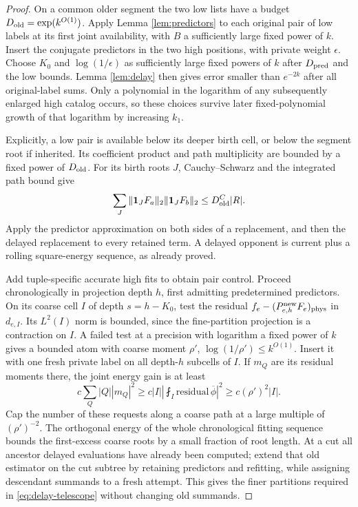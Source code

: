 \documentclass[11pt]{article}
\theoremstyle{definition}
\newcommand{\one}{\mathbf 1}
\newcommand{\avint}{\fint}
\newcommand{\phys}{\mathrm{phys}}
\numberwithin{equation}{section}
\begin{document}
\begin{proof}
On a common older segment the two low lists have a budget $D_{\rm old}=\exp(k^{O(1)})$. Apply Lemma \ref{lem:predictors} to each original pair of low labels at its first joint availability, with $B$ a sufficiently large fixed power of $k$. Insert the conjugate predictors in the two high positions, with private weight $\epsilon$. Choose $K_0$ and $\log(1/\epsilon)$ as sufficiently large fixed powers of $k$ after $D_{\rm pred}$ and the low bounds. Lemma \ref{lem:delay} then gives error smaller than $e^{-2k}$ after all original-label sums. Only a polynomial in the logarithm of any subsequently enlarged high catalog occurs, so these choices survive later fixed-polynomial growth of that logarithm by increasing $k_1$.

Explicitly, a low pair is available below its deeper birth cell, or below the segment root if inherited. Its coefficient product and path multiplicity are bounded by a fixed power of $D_{\rm old}$. For its birth roots $J$, Cauchy--Schwarz and the integrated path bound give
\[
 \sum_J\|\one_JF_a\|_2\|\one_JF_b\|_2\le D_{\rm old}^C|R|.
\]
Apply the predictor approximation on both sides of a replacement, and then the delayed replacement to every retained term. A delayed opponent is current plus a rolling square-energy sequence, as already proved.

Add tuple-specific accurate high fits to obtain pair control. Proceed chronologically in projection depth $h$, first admitting predetermined predictors. On its coarse cell $I$ of depth $s=h-K_0$, test the residual $f_e-(P^{\rm new}_{e,h}F_e)_{\phys}$ in $d_{e,I}$. Its $L^2(I)$ norm is bounded, since the fine-partition projection is a contraction on $I$. A failed test at a precision with logarithm a fixed power of $k$ gives a bounded atom with coarse moment $\rho'$, $\log(1/\rho')\le k^{O(1)}$. Insert it with one fresh private label on all depth-$h$ subcells of $I$. If $m_Q$ are its residual moments there, the joint energy gain is at least
\[
 c\sum_Q|Q||m_Q|^2\ge c|I|\left|\avint_I\text{residual}\,\overline\phi\right|^2
 \ge c(\rho')^2|I|.
\]
Cap the number of these requests along a coarse path at a large multiple of $(\rho')^{-2}$. The orthogonal energy of the whole chronological fitting sequence bounds the first-excess coarse roots by a small fraction of root length. At a cut all ancestor delayed evaluations have already been computed; extend that old estimator on the cut subtree by retaining predictors and refitting, while assigning descendant summands to a fresh attempt. This gives the finer partitions required in \eqref{eq:delay-telescope} without changing old summands.


\end{proof}
\end{document}
